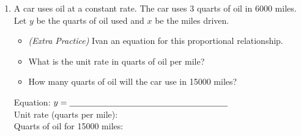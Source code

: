 \documentclass[12pt, letterpaper, fleqn]{article}
\newcommand{\blanklong}{\underline{\hspace{6.5cm}}}
\begin{document}
\begin{enumerate}[itemsep=2.5cm, leftmargin=0.6cm, resume]
\begin{itemize}
\item What is the meaning of the point $(1, 30)$ on the graph?
\item How many tickets will be sold on day 7?
\end{itemize}

\vspace{1.5cm}

\begin{tcolorbox}[colback=customteal!10, sharp corners]
Equation: $y = \blanklong$ \\
Meaning of $(1, 30)$: \blanklong \\
Tickets sold on day 7: \blanklong
\end{tcolorbox}

\vspace{1.5cm}
\item A car uses oil at a constant rate. The car uses 3 quarts of oil in 6000 miles. Let $y$ be the quarts of oil used and $x$ be the miles driven.
\begin{itemize}
\item \textit{(Extra Practice)} Ivan an equation for this proportional relationship.
\item What is the unit rate in quarts of oil per mile?
\item How many quarts of oil will the car use in 15000 miles?
\end{itemize}

\vspace{1.5cm}

\begin{tcolorbox}[colback=customteal!10, sharp corners]
Equation: $y = \blanklong$ \\
Unit rate (quarts per mile): \blanklong \\
Quarts of oil for 15000 miles: \blanklong
\end{tcolorbox}
\end{enumerate}
\end{document}
